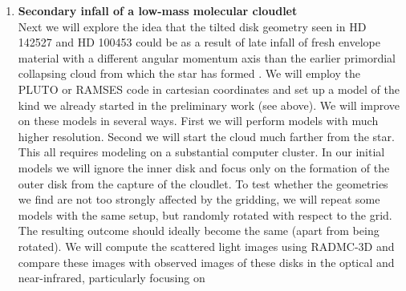 \documentclass[10pt,fleqn,twoside,a4paper]{article}
\begin{document}
\begin{enumerate}
\item {\bf Secondary infall of a low-mass molecular cloudlet}\label{subproj-infall-largescale}\\
  Next we will explore the idea that the tilted disk geometry seen in HD
  142527 and HD 100453 could be as a result of late infall of fresh envelope
  material with a different angular momentum axis than the earlier
  primordial collapsing cloud from which the star has formed \citep[the
  scenario by][but now applied to disks]{2011MNRAS.417.1817T}. We will
  employ the PLUTO or RAMSES code in cartesian coordinates and set up a
  model of the kind we already started in the preliminary work (see above).
  We will improve on these models in several ways. First we will perform
  models with much higher resolution. Second we will start the cloud much
  farther from the star. This all requires modeling on a substantial computer
  cluster. In our initial models we will ignore the inner disk and focus
  only on the formation of the outer disk from the capture of the cloudlet.
  To test whether the geometries we find are not too strongly affected by
  the gridding, we will repeat some models with the same setup, but randomly
  rotated with respect to the grid. The resulting outcome should ideally
  become the same (apart from being rotated). We will compute the scattered
  light images using RADMC-3D and compare these images with observed images
  of these disks in the optical and near-infrared, particularly focusing on

\end{enumerate}
\end{document}
